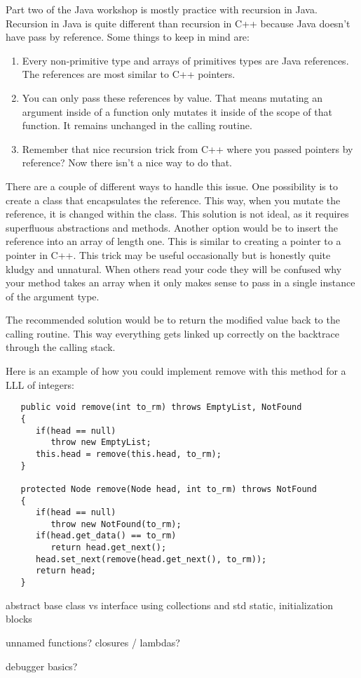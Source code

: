 \documentclass[../../main.tex]{subfiles}
\begin{document}
Part two of the Java workshop is mostly practice with recursion in Java. Recursion in Java is quite
different than recursion in C++ because Java doesn't have pass by reference.
Some things to keep in mind are:
   \begin{enumerate}[label=\Alph*.]
         \item Every non-primitive type and arrays of primitives types are Java references. The references
            are most similar to C++ pointers.
         \item You can only pass these references by value. That means mutating an argument inside of
            a function only mutates it inside of the scope of that function. It remains unchanged in
            the calling routine.
         \item Remember that nice recursion trick from C++ where you passed pointers by reference? Now
            there isn't a nice way to do that.
   \end{enumerate}

There are a couple of different ways to handle this issue. One possibility is to create a class that
encapsulates the reference. This way, when you mutate the reference, it is changed within the class.
This solution is not ideal, as it requires superfluous abstractions and methods. Another option would
be to insert the reference into an array of length one. This is similar to creating a pointer to a pointer
in C++. This trick may be useful occasionally but is honestly quite kludgy and unnatural. When others
read your code they will be confused why your method takes an array when it only makes sense to pass in a
single instance of the argument type.

The recommended solution would be to return the modified value back to the calling routine. This way
everything gets linked up correctly on the backtrace through the calling stack.

Here is an example of how you could implement remove with this method for a LLL of integers:

\begin{verbatim}
   public void remove(int to_rm) throws EmptyList, NotFound
   {
      if(head == null)
         throw new EmptyList;
      this.head = remove(this.head, to_rm);
   }

   protected Node remove(Node head, int to_rm) throws NotFound
   {
      if(head == null)
         throw new NotFound(to_rm);
      if(head.get_data() == to_rm)
         return head.get_next();
      head.set_next(remove(head.get_next(), to_rm));
      return head;
   }
\end{verbatim}

abstract base class vs interface
using collections and std
static, initialization blocks

unnamed functions? closures / lambdas?

debugger basics?
\end{document}
